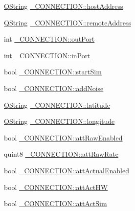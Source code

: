 \begin{DoxyCompactItemize}
\item 
\hyperlink{group___u_a_v_objects_plugin_gab9d252f49c333c94a72f97ce3105a32d}{\-Q\-String} \hyperlink{group___h_i_t_l_plugin_ga21da3bd31909fdf7fd5116c2a91a1176}{\-\_\-\-C\-O\-N\-N\-E\-C\-T\-I\-O\-N\-::host\-Address}
\item 
\hyperlink{group___u_a_v_objects_plugin_gab9d252f49c333c94a72f97ce3105a32d}{\-Q\-String} \hyperlink{group___h_i_t_l_plugin_ga72b83e685c950b6c36c9eed28c775ec4}{\-\_\-\-C\-O\-N\-N\-E\-C\-T\-I\-O\-N\-::remote\-Address}
\item 
int \hyperlink{group___h_i_t_l_plugin_gaaba6cf28320e1105f7320ea8a21df15b}{\-\_\-\-C\-O\-N\-N\-E\-C\-T\-I\-O\-N\-::out\-Port}
\item 
int \hyperlink{group___h_i_t_l_plugin_gabf3d6472bdcac5895a53143e1f84fb09}{\-\_\-\-C\-O\-N\-N\-E\-C\-T\-I\-O\-N\-::in\-Port}
\item 
bool \hyperlink{group___h_i_t_l_plugin_ga17c6b00bf3f43c686cca76b3286ba75c}{\-\_\-\-C\-O\-N\-N\-E\-C\-T\-I\-O\-N\-::start\-Sim}
\item 
bool \hyperlink{group___h_i_t_l_plugin_ga0d3c230504eb051a77593129ea6cd79f}{\-\_\-\-C\-O\-N\-N\-E\-C\-T\-I\-O\-N\-::add\-Noise}
\item 
\hyperlink{group___u_a_v_objects_plugin_gab9d252f49c333c94a72f97ce3105a32d}{\-Q\-String} \hyperlink{group___h_i_t_l_plugin_gac06d25b8e020f633a60fadb7e7eedfa9}{\-\_\-\-C\-O\-N\-N\-E\-C\-T\-I\-O\-N\-::latitude}
\item 
\hyperlink{group___u_a_v_objects_plugin_gab9d252f49c333c94a72f97ce3105a32d}{\-Q\-String} \hyperlink{group___h_i_t_l_plugin_gac60d13c120d3dd97309688a1d7f3d6d7}{\-\_\-\-C\-O\-N\-N\-E\-C\-T\-I\-O\-N\-::longitude}
\item 
bool \hyperlink{group___h_i_t_l_plugin_ga003958320fd5c963c5d2ddff60ffd28b}{\-\_\-\-C\-O\-N\-N\-E\-C\-T\-I\-O\-N\-::att\-Raw\-Enabled}
\item 
quint8 \hyperlink{group___h_i_t_l_plugin_ga70d4f6a60b23f4545d46ff7dfe4c710e}{\-\_\-\-C\-O\-N\-N\-E\-C\-T\-I\-O\-N\-::att\-Raw\-Rate}
\item 
bool \hyperlink{group___h_i_t_l_plugin_ga9b02793b3d0effcdb43df1d5e20012fd}{\-\_\-\-C\-O\-N\-N\-E\-C\-T\-I\-O\-N\-::att\-Actual\-Enabled}
\item 
bool \hyperlink{group___h_i_t_l_plugin_ga4e0f8f54388f25df1142b8f895a4b445}{\-\_\-\-C\-O\-N\-N\-E\-C\-T\-I\-O\-N\-::att\-Act\-H\-W}
\item 
bool \hyperlink{group___h_i_t_l_plugin_ga8620f5c9256ac5988861939a70fde264}{\-\_\-\-C\-O\-N\-N\-E\-C\-T\-I\-O\-N\-::att\-Act\-Sim}

\end{DoxyCompactItemize}
